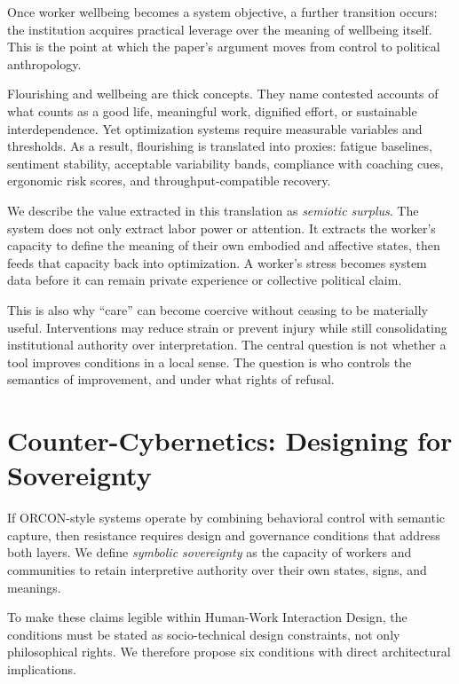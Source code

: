 \documentclass[runningheads]{llncs}
\begin{document}
Once worker wellbeing becomes a system objective, a further transition occurs: the institution acquires practical leverage over the meaning of wellbeing itself. This is the point at which the paper's argument moves from control to political anthropology.

Flourishing and wellbeing are thick concepts. They name contested accounts of what counts as a good life, meaningful work, dignified effort, or sustainable interdependence. Yet optimization systems require measurable variables and thresholds. As a result, flourishing is translated into proxies: fatigue baselines, sentiment stability, acceptable variability bands, compliance with coaching cues, ergonomic risk scores, and throughput-compatible recovery.

We describe the value extracted in this translation as \emph{semiotic surplus}. The system does not only extract labor power or attention. It extracts the worker's capacity to define the meaning of their own embodied and affective states, then feeds that capacity back into optimization. A worker's stress becomes system data before it can remain private experience or collective political claim.

This is also why ``care'' can become coercive without ceasing to be materially useful. Interventions may reduce strain or prevent injury while still consolidating institutional authority over interpretation. The central question is not whether a tool improves conditions in a local sense. The question is who controls the semantics of improvement, and under what rights of refusal.

\section{Counter-Cybernetics: Designing for Sovereignty}

If ORCON-style systems operate by combining behavioral control with semantic capture, then resistance requires design and governance conditions that address both layers. We define \emph{symbolic sovereignty} as the capacity of workers and communities to retain interpretive authority over their own states, signs, and meanings.

To make these claims legible within Human-Work Interaction Design, the conditions must be stated as socio-technical design constraints, not only philosophical rights. We therefore propose six conditions with direct architectural implications.
\end{document}
